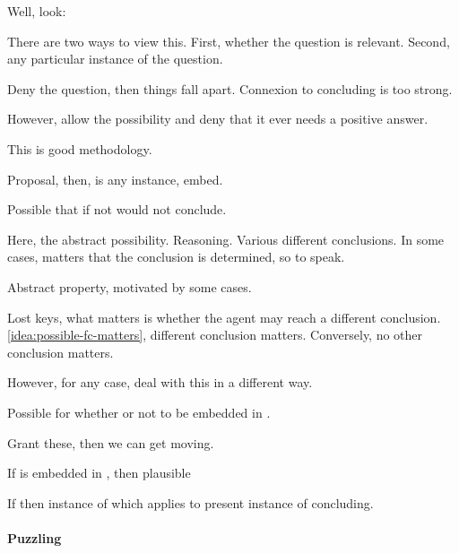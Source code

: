 \begin{note}
  Well, look:

  There are two ways to view this.
  First, whether the question is relevant.
  Second, any particular instance of the question.

  Deny the question, then things fall apart.
  Connexion to concluding is too strong.

  However, allow the possibility and deny that it ever needs a positive answer.

  This is good methodology.

  Proposal, then, is any instance, embed.

  \begin{idea}
    \label{idea:possible-fc-matters}
    Possible that if not \fc{} would not conclude.
  \end{idea}

  Here, the abstract possibility.
  Reasoning.
  Various different conclusions.
  In some cases, matters that the conclusion is determined, so to speak.

  Abstract property, motivated by some cases.

  Lost keys, what matters is whether the agent may reach a different conclusion.
  \autoref{idea:possible-fc-matters}, different conclusion matters.
  Conversely, no other conclusion matters.

  However, for any case, deal with this in a different way.

  \begin{idea}
    Possible for whether or not \fc{} to be embedded in \support{}.
  \end{idea}

  Grant these, then we can get moving.
\end{note}

\begin{note}
  \begin{proposition}
    If \fc{} is embedded in \support{}, then plausible \requ{}
  \end{proposition}

  \begin{proposition}
    If \requ{} then instance of \qzS{} which applies to present instance of concluding.
  \end{proposition}
\end{note}

\paragraph{Puzzling}

